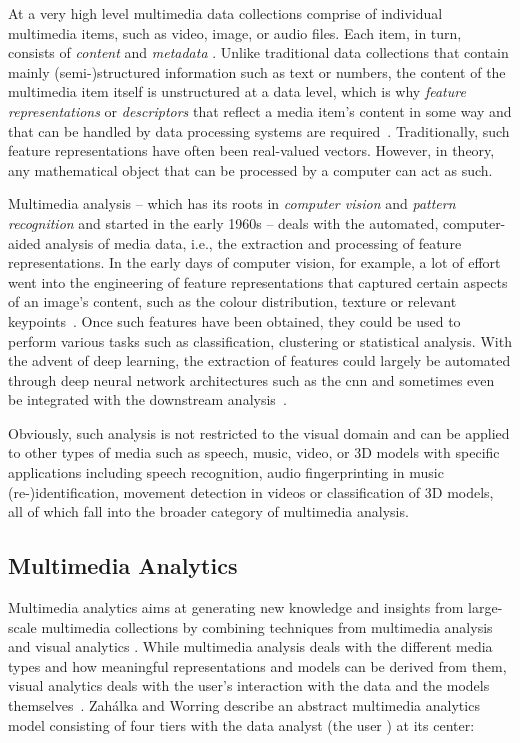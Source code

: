 At a very high level multimedia data collections comprise of individual multimedia items, such as video, image, or audio files. Each item, in turn, consists of \emph{content} and \emph{metadata} \cite{Blanken:2007multimedia}. Unlike traditional data collections that contain mainly (semi-)structured information such as text or numbers, the content of the multimedia item itself is unstructured at a data level, which is why \emph{feature representations} or \emph{descriptors} that reflect a media item's content in some way and that can be handled by data processing systems are required~\cite{Blanken:2007multimedia,Zahalka:2014Towards}. Traditionally, such feature representations have often been real-valued vectors. However, in theory, any mathematical object that can be processed by a computer can act as such. 

Multimedia analysis -- which has its roots in \emph{computer vision} and \emph{pattern recognition} and started in the early 1960s -- deals with the automated, computer-aided analysis of media data, i.e., the extraction and processing of feature representations. In the early days of computer vision, for example, a lot of effort went into the engineering of feature representations that captured certain aspects of an image's content, such as the colour distribution, texture or relevant keypoints~\cite{Lowe:1999object,Bay:2006surf}. Once such features have been obtained, they could be used to perform various tasks such as classification, clustering or statistical analysis. With the advent of deep learning, the extraction of features could largely be automated through deep neural network architectures such as the \acrfull{cnn} and sometimes even be integrated with the downstream analysis~\cite{Goodfellow:2016deep}. 

Obviously, such analysis is not restricted to the visual domain and can be applied to other types of media such as speech, music, video, or 3D models with specific applications including speech recognition, audio fingerprinting in music (re-)identification, movement detection in videos or classification of 3D models, all of which fall into the broader category of multimedia analysis.

\subsection{Multimedia Analytics}

Multimedia analytics aims at generating new knowledge and insights from large-scale multimedia collections by combining techniques from multimedia analysis and visual analytics \cite{Zahalka:2014Towards,Seebacher:2017Visual}. While multimedia analysis deals with the different media types and how meaningful representations and models can be derived from them, visual analytics deals with the user's interaction with the data and the models themselves~\cite{Chinchor:2010Multimedia,Keim:2010mastering}. 
Zahálka and Worring \cite{Zahalka:2014Towards} describe an abstract multimedia analytics model consisting of four tiers with the data analyst (the user \cite{Seebacher:2017Visual}) at its center:

